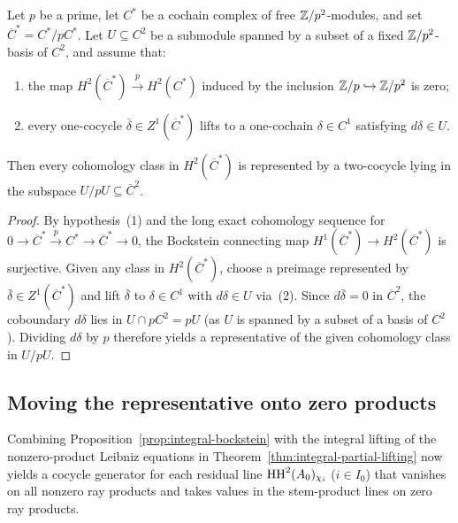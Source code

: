 \begin{lemma}
\label{lem:supported-bockstein}
Let $p$ be a prime, let $C^*$ be a cochain complex of free $\mathbb Z/p^2$-modules, and set $\overline C^*=C^*/pC^*$. Let $U\subseteq C^2$ be a submodule spanned by a subset of a fixed $\mathbb Z/p^2$-basis of $C^2$, and assume that:
\begin{enumerate}[label={\upshape(\arabic*)}]
\item the map $H^2(\overline C^*)\xrightarrow{p}H^2(C^*)$ induced by the inclusion $\mathbb Z/p\hookrightarrow\mathbb Z/p^2$ is zero;
\item every one-cocycle $\bar\delta\in Z^1(\overline C^*)$ lifts to a one-cochain $\delta\in C^1$ satisfying $d\delta\in U$.
\end{enumerate}
Then every cohomology class in $H^2(\overline C^*)$ is represented by a two-cocycle lying in the subspace $U/pU\subseteq\overline C^2$.
\end{lemma}
\begin{proof}
By hypothesis~(1) and the long exact cohomology sequence for $0\to\overline C^*\xrightarrow{p}C^*\to\overline C^*\to0$, the Bockstein connecting map $H^1(\overline C^*)\to H^2(\overline C^*)$ is surjective. Given any class in $H^2(\overline C^*)$, choose a preimage represented by $\bar\delta\in Z^1(\overline C^*)$ and lift $\bar\delta$ to $\delta\in C^1$ with $d\delta\in U$ via~(2). Since $d\bar\delta=0$ in $\overline C^2$, the coboundary $d\delta$ lies in $U\cap pC^2=pU$ (as $U$ is spanned by a subset of a basis of $C^2$). Dividing $d\delta$ by $p$ therefore yields a representative of the given cohomology class in $U/pU$.
\end{proof}

\subsection{Moving the representative onto zero products}

Combining Proposition~\ref{prop:integral-bockstein} with the integral lifting of the nonzero-product Leibniz equations in Theorem~\ref{thm:integral-partial-lifting} now yields a cocycle generator for each residual line $\operatorname{HH}^2(A_0)_{\chi_i}$ ($i\in I_0$) that vanishes on all nonzero ray products and takes values in the stem-product lines on zero ray products.

